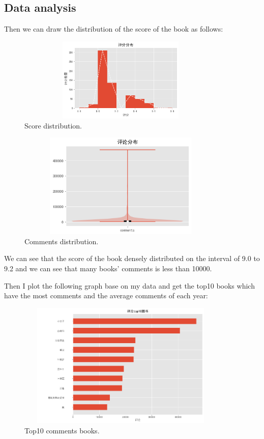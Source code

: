 \documentclass[12pt, a4paper]{article}
\begin{document}
\subsection{Data analysis}
Then we can draw the distribution of the score of 
the book as follows:

\begin{figure}[ht]
    \centering
    \includegraphics[width=10cm,height=4cm]{p3.png}
    \caption{Score distribution.}
\end{figure}

\begin{figure}[ht]
    \centering
    \includegraphics[width=10cm,height=5cm]{p4.png}
    \caption{Comments distribution.}
\end{figure}

\newpage{}

We can see that the score of the book densely distributed on the 
interval of 9.0 to 9.2 and we can see that many books’ comments 
is less than 10000.

Then I plot the following graph base on my data and get the 
top10 books which have the most comments and the average 
comments of each year:

\begin{figure}[ht]
    \centering
    \includegraphics[width=10cm,height=6cm]{p5.png}
    \caption{Top10 comments books.}
\end{figure}
\end{document}
